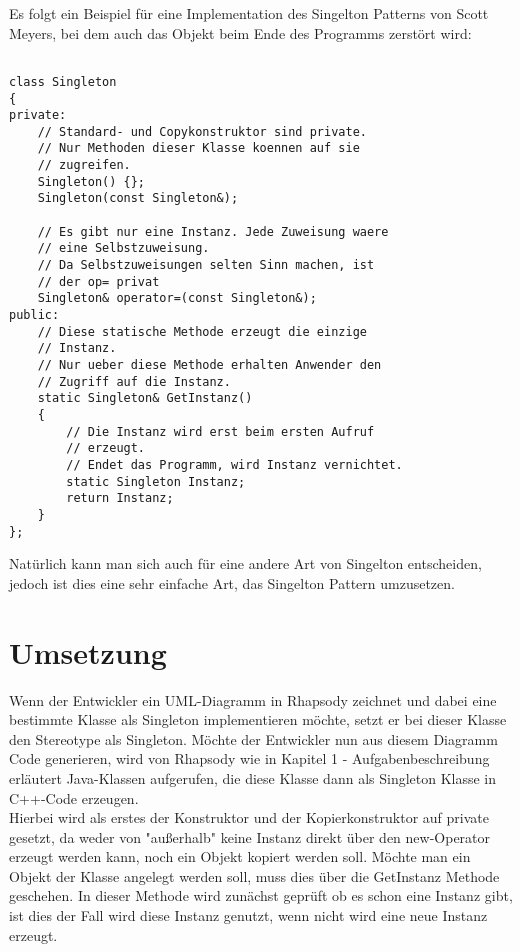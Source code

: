 Es folgt ein Beispiel für eine Implementation des Singelton Patterns von Scott Meyers, bei dem auch das Objekt beim Ende des Programms zerstört wird:
\begin{lstlisting}

class Singleton
{
private:
    // Standard- und Copykonstruktor sind private. 
    // Nur Methoden dieser Klasse koennen auf sie 
    // zugreifen.
    Singleton() {};
    Singleton(const Singleton&);

    // Es gibt nur eine Instanz. Jede Zuweisung waere
    // eine Selbstzuweisung.
    // Da Selbstzuweisungen selten Sinn machen, ist
    // der op= privat
    Singleton& operator=(const Singleton&);
public:
    // Diese statische Methode erzeugt die einzige
    // Instanz.
    // Nur ueber diese Methode erhalten Anwender den 
    // Zugriff auf die Instanz.
    static Singleton& GetInstanz() 
    {
        // Die Instanz wird erst beim ersten Aufruf
        // erzeugt.
        // Endet das Programm, wird Instanz vernichtet.
        static Singleton Instanz;
        return Instanz;
    }
};
\end{lstlisting}
Natürlich kann man sich auch für eine andere Art von Singelton entscheiden, jedoch ist dies eine sehr einfache Art, das Singelton Pattern umzusetzen.

\section{Umsetzung}

Wenn der Entwickler ein UML-Diagramm in Rhapsody zeichnet und dabei eine bestimmte Klasse als Singleton implementieren möchte, setzt er bei dieser Klasse den Stereotype als Singleton. Möchte der Entwickler nun aus diesem Diagramm Code generieren, wird von Rhapsody wie in Kapitel 1 - Aufgabenbeschreibung erläutert Java-Klassen aufgerufen, die diese Klasse dann als Singleton Klasse in C++-Code erzeugen. 
\\
Hierbei wird als erstes der Konstruktor und der Kopierkonstruktor auf private gesetzt, da weder von "außerhalb" keine Instanz direkt über den new-Operator erzeugt werden kann, noch ein Objekt kopiert werden soll. Möchte man ein Objekt der Klasse angelegt werden soll, muss dies über die GetInstanz Methode geschehen. In dieser Methode wird zunächst geprüft ob es schon eine Instanz gibt, ist dies der Fall wird diese Instanz genutzt, wenn nicht wird eine neue Instanz erzeugt. 




